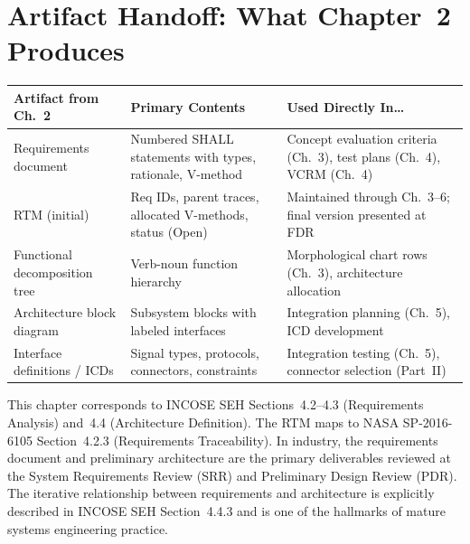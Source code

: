 \documentclass[11pt,letterpaper,twoside,openany]{book}
\begin{document}
\FloatBarrier
\section{Artifact Handoff: What Chapter~2 Produces}

\begin{center}
\small
\begin{tabularx}{\textwidth}{l X X}
\toprule
\textbf{Artifact from Ch.~2} & \textbf{Primary Contents} & \textbf{Used Directly In\ldots} \\
\midrule
Requirements document & Numbered SHALL statements with types, rationale, V-method & Concept evaluation criteria (Ch.~3), test plans (Ch.~4), VCRM (Ch.~4) \\
RTM (initial) & Req IDs, parent traces, allocated V-methods, status (Open) & Maintained through Ch.~3--6; final version presented at FDR \\
Functional decomposition tree & Verb-noun function hierarchy & Morphological chart rows (Ch.~3), architecture allocation \\
Architecture block diagram & Subsystem blocks with labeled interfaces & Integration planning (Ch.~5), ICD development \\
Interface definitions / ICDs & Signal types, protocols, connectors, constraints & Integration testing (Ch.~5), connector selection (Part~II) \\
\bottomrule
\end{tabularx}
\end{center}

\begin{tipbox}
This chapter corresponds to INCOSE SEH Sections~4.2--4.3 (Requirements Analysis) and~4.4 (Architecture Definition). The RTM maps to NASA SP-2016-6105 Section~4.2.3 (Requirements Traceability). In industry, the requirements document and preliminary architecture are the primary deliverables reviewed at the System Requirements Review (SRR) and Preliminary Design Review (PDR). The iterative relationship between requirements and architecture is explicitly described in INCOSE SEH Section~4.4.3 and is one of the hallmarks of mature systems engineering practice.
\end{tipbox}

\FloatBarrier
\end{document}
